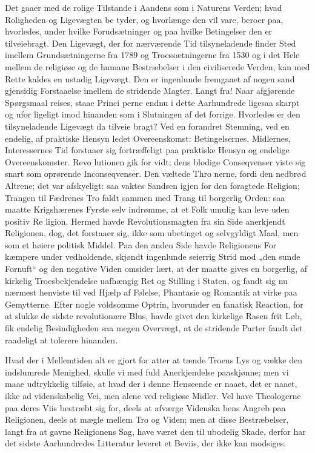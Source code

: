\documentclass[12pt]{book}
\newcommand{\opage}[1]{\marginnote{\footnotesize\textit{[#1]}}}
\begin{document}
Det gaaer med de rolige Tilstande i Aandens som
i Naturens Verden; hvad Roligheden og Ligevægten be\-%
tyder, og hvorlænge den vil vare, beroer paa, hvorledes,
under hvilke Forudsætninger og paa hvilke Betingelser
den er tilveiebragt. Den Ligevægt, der for nærværende
Tid tilsyneladende finder Sted imellem Grundsætningerne
fra 1789 og Troessætningerne fra 1530 og i det Hele
mellem de religiøse og de humane Bestræbelser i den
civiliserede Verden, kan med Rette kaldes en ustadig
Ligevægt. Den er ingenlunde fremgaaet af nogen sand
gjensidig Forstaaelse imellem de stridende Magter. Langt
fra! Naar afgjørende Spørgsmaal reises, staae Princi\-%
perne endnu i dette Aarhundrede ligesaa skarpt og ufor\-%
ligeligt imod hinanden som i Slutningen af det forrige.
Hvorledes er den tilsyneladende Ligevægt da tilveie\-%
bragt? Ved en forandret Stemning, ved en endelig, af
praktiske Hensyn ledet Overeenskomst: Betingelsernes,
Midlernes, Interessernes Tid forstaaer sig fortræffeligt paa
praktiske Hensyn og endelige Overeenskomster. Revo\-%
lutionen gik for vidt; dens blodige Conseqvenser viste sig
snart som oprørende Inconseqvenser. Den væltede Thro\-%
nerne, fordi den nedbrød Altrene; det var afskyeligt:
saa vaktes Sandsen igjen for den foragtede Religion;
Trangen til Fædrenes Tro faldt sammen med Trang til
borgerlig Orden: saa maatte Krigshærenes Fyrste selv
indrømme, at et Folk umulig kan leve uden positiv Re\-%
ligion. Hermed havde Revolutionsmagten fra sin Side
anerkjendt Religionen, dog, det forstaaer sig, ikke som
ubetinget og selvgyldigt Maal, men som et høiere politisk
Middel. Paa den anden Side havde Religionens For\-%
kæmpere under vedholdende, skjøndt ingenlunde seierrig
\opage{39}\setcounter{footnote}{0}%
Strid mod „den sunde Fornuft“ og den negative Viden
omsider lært, at der maatte gives en borgerlig, af kirkelig
Troesbekjendelse uafhængig Ret og Stilling i Staten, og
fandt sig nu nærmest henviste til ved Hjælp af Følelse,
Phantasie og Romantik at virke paa Gemytterne. Efter
nogle voldsomme Optrin, hvorunder en fanatisk Reaction,
for at slukke de sidste revolutionære Blus, havde givet
den kirkelige Rasen frit Løb, fik endelig Besindigheden
saa megen Overvægt, at de stridende Parter fandt det
raadeligt at tolerere hinanden.

Hvad der i Mellemtiden alt er gjort for atter at
tænde Troens Lys og vække den indslumrede Menighed,
skulle vi med fuld Anerkjendelse paaskjønne; men vi
maae udtrykkelig tilføie, at hvad der i denne Henseende
er naaet, det er naaet, ikke ad videnskabelig Vei, men
alene ved religiøse Midler. Vel have Theologerne paa
deres Viis bestræbt sig for, deels at afværge Videnska\-%
bens Angreb paa Religionen, deels at mægle mellem Tro
og Viden; men at disse Bestræbelser, langt fra at gavne
Religionens Sag, have været den til ubodelig Skade,
derfor har det sidste Aarhundredes Litteratur leveret et
Beviis, der ikke kan modsiges.
\end{document}

